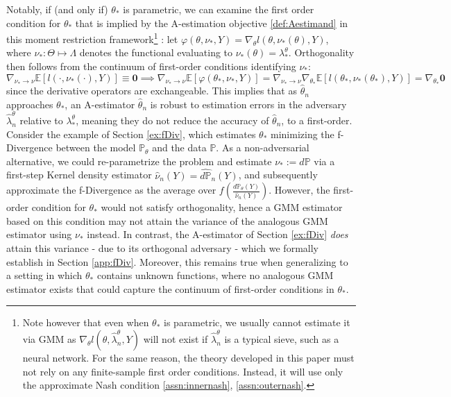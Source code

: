 \documentclass[12pt]{article}
\theoremstyle{myplain}
\theoremstyle{definition}
\theoremstyle{definition}
\theoremstyle{remark}
\numberwithin{equation}{section}
\begin{document}
Notably, if (and only if) $\theta_*$ is parametric, we can examine the first order condition for $\theta_*$ that is implied by the A-estimation objective \ref{def:Aestimand} in this moment restriction framework\footnote{Note however that even when $\theta_*$ is parametric, we usually cannot estimate it via GMM as $\nabla_\theta l(\theta, \widehat\lambda_n^\theta, Y)$ will not exist if $\widehat\lambda_n^\theta$ is a typical sieve, such as a neural network. For the same reason, the theory developed in this paper must not rely on any finite-sample first order conditions. Instead, it will use only the approximate Nash condition \ref{assn:innernash}, \ref{assn:outernash}.} : let $\varphi(\theta, \nu_*, Y)=\nabla_\theta l(\theta, \nu_*(\theta), Y)$, where $\nu_* : \Theta \mapsto \Lambda$ denotes the functional evaluating to $\nu_*(\theta)=\lambda_*^\theta$. Orthogonality then follows from the continuum of first-order conditions identifying $\nu_*$:
\begin{equation*}
\nabla_{ \nu_*\to \nu} \mathbb{E}[l(\cdot, \nu_*(\cdot), Y)]\equiv\mathbf{0} \implies \nabla_{\nu_*\to\nu}\mathbb{E}[\varphi(\theta_*, \nu_*, Y)]=\nabla_{\nu_*\to\nu}\nabla_{\theta_*}\mathbb{E}[l(\theta_*, \nu_*(\theta_*), Y)]=\nabla_{\theta_*} \mathbf{0}
\end{equation*}
since the derivative operators are exchangeable. This implies that as $\widehat\theta_n$ approaches $\theta_*$, an A-estimator $\widehat\theta_n$ is robust to estimation errors in the adversary $\widehat\lambda_n^\theta$ relative to $\lambda_*^\theta$, meaning they do not reduce the accuracy of $\widehat\theta_n$, to a first-order.\\

Consider the example of Section \ref{ex:fDiv}, which estimates $\theta_*$ minimizing the f-Divergence between the model $\mathbb{P}_\theta$ and the data $\mathbb{P}$. As a non-adversarial alternative, we could re-parametrize the problem and estimate $\nu_*:=d\mathbb{P}$ via a first-step Kernel density estimator $\widehat{\nu}_n(Y)=\widehat{d\mathbb{P}}_n(Y)$, and subsequently approximate the f-Divergence as the average over $f\left(\frac{d\mathbb{P}_\theta(Y)}{\widehat{\nu}_n(Y)}\right)$. However, the first-order condition for $\theta_*$ would not satisfy orthogonality, hence a GMM estimator based on this condition may not attain the variance of the analogous GMM estimator using $\nu_*$ instead. In contrast, the A-estimator of Section \ref{ex:fDiv} {\it does} attain this variance - due to its orthogonal adversary - which we formally establish in Section \ref{app:fDiv}. Moreover, this remains true when generalizing to a setting in which $\theta_*$ contains unknown functions, where no analogous GMM estimator exists that could capture the continuum of first-order conditions in $\theta_*$.
\end{document}
